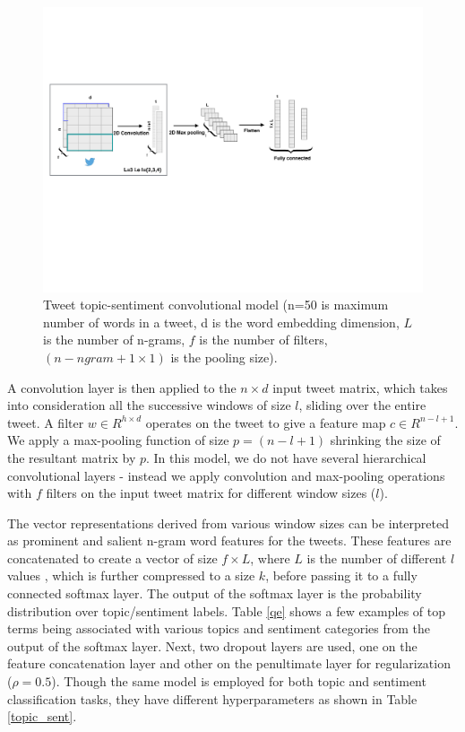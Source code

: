 \documentclass[letterpaper]{article}
\begin{document}
\begin{figure}[]
\centering
\includegraphics[width=\columnwidth]{topic_classifier.pdf}
\caption{Tweet topic-sentiment convolutional model (n=50 is maximum number of words in a tweet, d is the word embedding dimension, $L$ is the number of n-grams, $f$ is the number of filters, $(n-ngram+1\times 1)$ is the pooling size).}
\label{topic_cnn}
\end{figure}

A convolution layer is then applied to the $n \times d$ input tweet matrix, which takes into consideration all the successive windows of size $l$, sliding over the entire tweet. A filter $w \in {R}^{h\times d}$ operates on the tweet to give a feature map $c\in {R}^{n-l+1}$. We apply a max-pooling function \cite{collobert2011natural} of size $p=(n-l+1)$ shrinking the size of the resultant matrix by $p$. In this model, we do not have several hierarchical convolutional layers - instead we apply convolution and max-pooling operations with $f$ filters on the input tweet matrix for different window sizes ($l$).


The vector representations derived from various window sizes can be interpreted as prominent and salient n-gram word features for the tweets. These features are concatenated to create a vector of size $f \times L$, where $L$ is the number of different $l$ values , which is further compressed to a size $k$, before passing it to a fully connected softmax layer. The output of the softmax layer is the probability distribution over topic/sentiment labels. Table \ref{qe} shows a few examples of top terms being associated with various topics and sentiment categories from the output of the softmax layer. Next, two dropout layers are used, one on the feature concatenation layer and other on the penultimate layer for regularization ($\rho=0.5$). Though the same model is employed for both topic and sentiment classification tasks, they have different hyperparameters as shown in Table \ref{topic_sent}.
\end{document}
